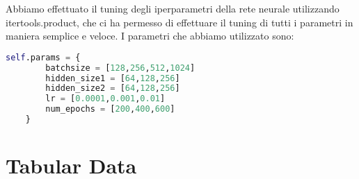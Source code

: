 \documentclass[../../Report.tex]{subfiles}
\begin{document}
Abbiamo effettuato il tuning degli iperparametri della rete neurale utilizzando itertools.product, che ci ha permesso di effettuare il tuning di tutti i parametri in maniera semplice e veloce.
I parametri che abbiamo utilizzato sono:
\begin{lstlisting}[language=python]
    self.params = {
        batchsize = [128,256,512,1024]	
        hidden_size1 = [64,128,256]
        hidden_size2 = [64,128,256]
        lr = [0.0001,0.001,0.01]
        num_epochs = [200,400,600]
    }
\end{lstlisting}

\section*{Tabular Data}
\end{document}
